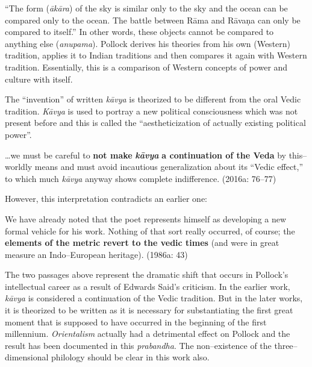 “The form (\textit{ākāra}) of the sky is similar only to the sky and the ocean can be compared only to the ocean. The battle between Rāma and Rāvaṇa can only be compared to itself.” In other words, these objects cannot be compared to anything else (\textit{anupama}). Pollock derives his theories from his own (Western) tradition, applies it to Indian traditions and then compares it again with Western tradition. Essentially, this is a comparison of Western concepts of power and culture with itself.

The “invention” of written \textit{kāvya} is theorized to be different from the oral Vedic tradition. \textit{Kāvya }is used to portray a new political consciousness which was not present before and this is called the “aestheticization of actually existing political power”.

\begin{myquote}
…we must be careful to \textbf{not make }\textit{\textbf{kāvya }}\textbf{a continuation of the Veda} by this–worldly means and must avoid incautious generalization about its “Vedic effect,” to which much\textit{ kāvya }anyway shows complete indifference. (2016a: 76–77)
\end{myquote}

\newpage

However, this interpretation contradicts an earlier one:

\begin{myquote}
We have already noted that the poet represents himself as developing a new formal vehicle for his work. Nothing of that sort really occurred, of course; the \textbf{elements of the metric revert to the vedic times} (and were in great measure an Indo–European heritage). (1986a: 43)
\end{myquote}

The two passages above represent the dramatic shift that occurs in Pollock’s intellectual career as a result of Edwards Said’s criticism. In the earlier work, \textit{kāvya }is considered a continuation of the Vedic tradition. But in the later works, it is theorized to be written as it is necessary for substantiating the first great moment that is supposed to have occurred in the beginning of the first millennium. \textit{Orientalism} actually had a detrimental effect on Pollock and the result has been documented in this \textit{prabandha}. The non–existence of the three–dimensional philology should be clear in this work also.

